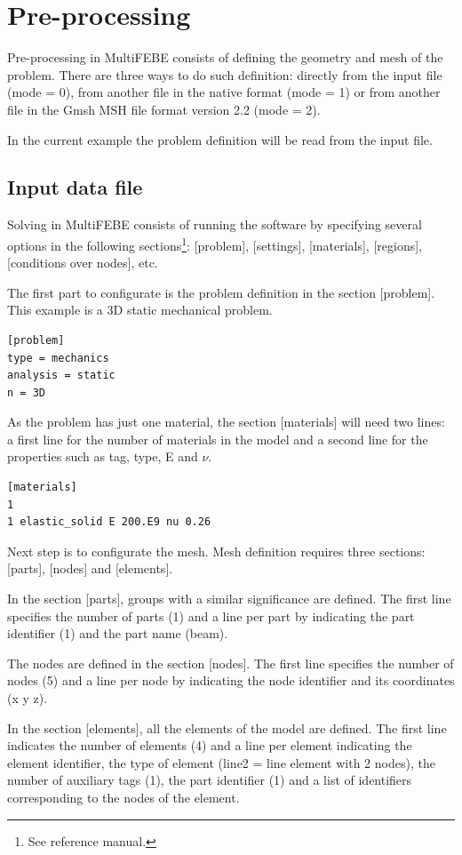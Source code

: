 \documentclass[a4]{article}
\begin{document}
\section{Pre-processing} 
Pre-processing in MultiFEBE consists of defining the geometry and mesh of the problem. There are three ways to do such definition: directly from the input file (mode = 0), from another file in the native format (mode = 1) or from another file in the Gmsh MSH file format version 2.2 (mode = 2). 

In the current example the problem definition will be read from the input file. 

\subsection{Input data file}
Solving in MultiFEBE consists of running the software by specifying several options in the following sections\footnote{See reference manual.}: [problem], [settings], [materials], [regions], [conditions over nodes], etc.

The first part to configurate is the problem definition in the section [problem]. This example is a 3D static mechanical problem.

\begin{Verbatim}	
[problem]
type = mechanics
analysis = static
n = 3D
\end{Verbatim}

As the problem has just one material, the section [materials] will need two lines: a first line for the number of materials in the model and a second line for the properties such as tag, type, E and $\nu$.

\begin{Verbatim}
[materials]
1
1 elastic_solid E 200.E9 nu 0.26
\end{Verbatim}

Next step is to configurate the mesh. Mesh definition requires three sections: [parts], [nodes] and [elements]. 

In the section [parts], groups with a similar significance are defined. The first line specifies the number of parts (1) and a line per part by indicating the part identifier (1) and the part name (beam).    

The nodes are defined in the section [nodes]. The first line specifies the number of nodes (5) and a line per node by indicating the node identifier and its coordinates (x y z).    

In the section [elements], all the elements of the model are defined. The first line indicates the number of elements (4) and a line per element indicating the element identifier, the type of element (line2 = line element with 2 nodes), the number of auxiliary tags (1), the part identifier (1) and a list of identifiers corresponding to the nodes of the element.
\end{document}
